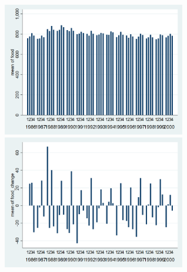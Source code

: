\documentclass[12pt,a4paper]{article}
\begin{document}
\begin{center}
\includegraphics[width=8cm]{graphs/food_quarterly.png}
\includegraphics[width=8cm]{graphs/food_change_quarterly.png}\\
\end{center}
\end{document}
